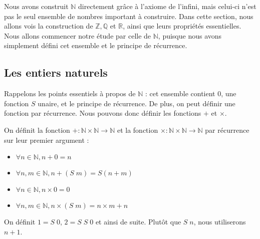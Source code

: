 Nous avons construit $\mathbb N$ directement grâce à l'axiome de l'infini, mais
celui-ci n'est pas le seul ensemble de nombres important à construire. Dans cette
section, nous allons vois la construction de $\mathbb Z, \mathbb Q$ et
$\mathbb R$, ainsi que leurs propriétés essentielles. Nous allons commencer notre
étude par celle de $\mathbb N$, puisque nous avons simplement défini cet ensemble
et le principe de récurrence.

\subsection{Les entiers naturels}

Rappelons les points essentiels à propos de $\mathbb N$ : cet ensemble contient
$0$, une fonction $S$ unaire, et le principe de récurrence. De plus, on peut
définir une fonction par récurrence. Nous pouvons donc définir les fonctions
$+$ et $\times$.

\begin{definition}
  On définit la fonction $+ : \mathbb N \times \mathbb N \to \mathbb N$ et la
  fonction $\times : \mathbb N \times \mathbb N \to \mathbb N$ par récurrence
  sur leur premier argument :
  \begin{itemize}
  \item $\forall n \in \mathbb N, n + 0 = n$
  \item $\forall n,m\in \mathbb N, n + (S\;m) = S(n + m)$
  \item $\forall n \in \mathbb N, n \times 0 = 0$
  \item $\forall n,m\in\mathbb N, n \times (S\;m) = n\times m + n$
  \end{itemize}
\end{definition}

\begin{notation}
  On définit $1 = S\;0$, $2 = S\;S\;0$ et ainsi de suite. Plutôt que $S\;n$, nous
  utiliserons $n + 1$.
\end{notation}

